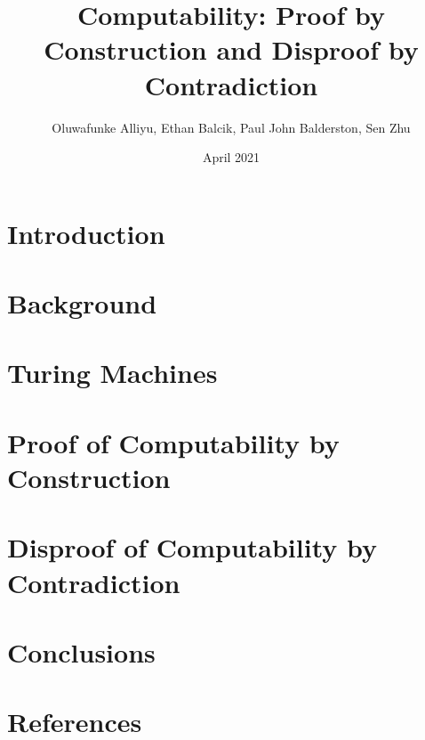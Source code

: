 \documentclass{article}
\title{Computability: Proof by Construction and Disproof by Contradiction}
\author{Oluwafunke Alliyu, Ethan Balcik, Paul John Balderston, Sen Zhu}
\date{April 2021}
\begin{document}
\maketitle

\section{Introduction}
\section{Background}
\section{Turing Machines}
\section{Proof of Computability by Construction}
\section{Disproof of Computability by Contradiction}
\section{Conclusions}
\section{References}
\end{document}
